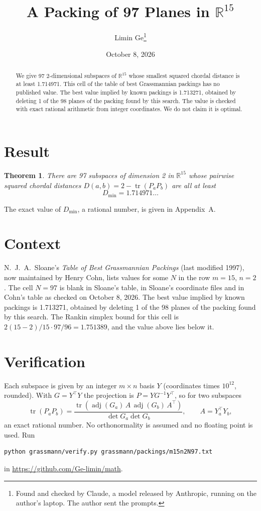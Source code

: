 \documentclass[11pt,a4paper]{article}
\title{A Packing of 97 Planes in $\mathbb{R}^{15}$}
\author{Limin Ge\thanks{Found and checked by Claude, a model released by Anthropic, running on the author's laptop. The author sent the prompts.}}
\date{October 8, 2026}
\newtheorem*{theorem}{Theorem}
\begin{document}
\maketitle
\begin{abstract}
We give 97 2-dimensional subspaces of $\mathbb{R}^{15}$ whose smallest squared chordal distance is at least 1.714971. This cell of the table of best Grassmannian packings has no published value. The best value implied by known packings is 1.713271, obtained by deleting 1 of the 98 planes of the packing found by this search. The value is checked with exact rational arithmetic from integer coordinates. We do not claim it is optimal.
\end{abstract}

\section{Result}
\begin{theorem}
There are 97 subspaces of dimension 2 in $\mathbb{R}^{15}$ whose pairwise squared chordal distances $D(a,b) = 2 - \operatorname{tr}(P_aP_b)$ are all at least
\[ D_{\min} = 1.714971\ldots \]
\end{theorem}
The exact value of $D_{\min}$, a rational number, is given in Appendix~A.


\section{Context}
N.~J.~A.~Sloane's \emph{Table of Best Grassmannian Packings} (last modified 1997), now maintained by Henry Cohn, lists values for some $N$ in the row $m=15$, $n=2$. The cell $N=97$ is blank in Sloane's table, in Sloane's coordinate files and in Cohn's table as checked on October 8, 2026. The best value implied by known packings is 1.713271, obtained by deleting 1 of the 98 planes of the packing found by this search. The Rankin simplex bound for this cell is $2(15-2)/15\cdot 97/96 = 1.751389$, and the value above lies below it.


\section{Verification}
Each subspace is given by an integer $m\times n$ basis $Y$ (coordinates times $10^{12}$, rounded). With $G=Y^\top Y$ the projection is $P=YG^{-1}Y^\top$, so for two subspaces
\[ \operatorname{tr}(P_aP_b)=\frac{\operatorname{tr}(\operatorname{adj}(G_a)\,A\,\operatorname{adj}(G_b)\,A^\top)}{\det G_a\det G_b},\qquad A=Y_a^\top Y_b, \]
an exact rational number. No orthonormality is assumed and no floating point is used. Run
\begin{verbatim}
python grassmann/verify.py grassmann/packings/m15n2N97.txt
\end{verbatim}
in \url{https://github.com/Ge-limin/math}.
\end{document}
